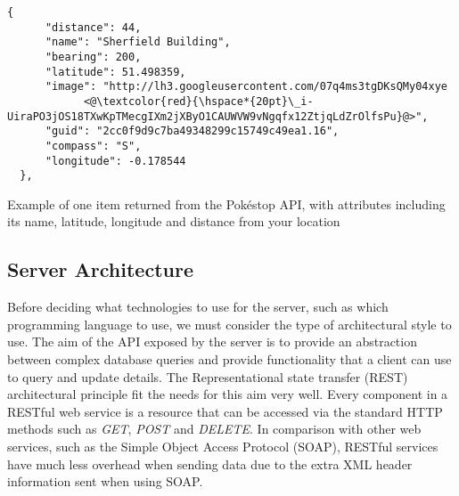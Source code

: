 \begin{listing}
  \centering
  \begin{lstlisting}[style=json]
  {
      "distance": 44, 
      "name": "Sherfield Building", 
      "bearing": 200, 
      "latitude": 51.498359, 
      "image": "http://lh3.googleusercontent.com/07q4ms3tgDKsQMy04xye
            <@\textcolor{red}{\hspace*{20pt}\_i-UiraPO3jOS18TXwKpTMecgIXm2jXByO1CAUWVW9vNgqfx12ZtjqLdZrOlfsPu}@>", 
      "guid": "2cc0f9d9c7ba49348299c15749c49ea1.16", 
      "compass": "S", 
      "longitude": -0.178544
  }, 
  \end{lstlisting}
  \caption{Example of one item returned from the Pok\'{e}stop API, with attributes including its name, latitude, longitude and distance from your location}
  \label{listing:pokestop}
\end{listing}









\subsection{Server Architecture} \label{subsection:server-architecture}

Before deciding what technologies to use for the server, such as which programming language to use, we must consider the type of architectural style to use. The aim of the API exposed by the server is to provide an abstraction between complex database queries and provide functionality that a client can use to query and update details. The Representational state transfer (REST) architectural principle fit the needs for this aim very well. Every component in a RESTful web service is a resource that can be accessed via the standard HTTP methods such as \textit{GET}, \textit{POST} and \textit{DELETE}. In comparison with other web services, such as the Simple Object Access Protocol (SOAP), RESTful services have much less overhead when sending data due to the extra XML header information sent when using SOAP.

